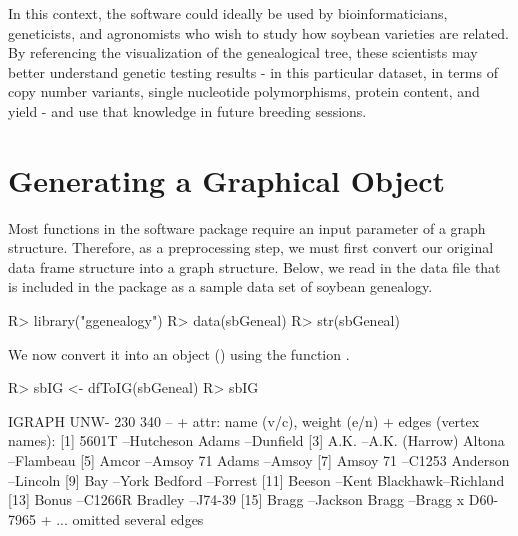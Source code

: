 \documentclass[article,shortnames]{jss}
\begin{document}
In this context, the software could ideally be used by bioinformaticians, geneticists, and agronomists who wish to study how soybean varieties are related. By referencing the visualization of the genealogical tree, these scientists may better understand genetic testing results - in this particular dataset, in terms of copy number variants, single nucleotide polymorphisms, protein content, and yield - and use that knowledge in future breeding sessions.

\section{Generating a Graphical Object}

Most functions in the software package require an input parameter of a graph structure. Therefore, as a preprocessing step, we must first convert our original data frame structure into a graph structure. Below, we read in the  data file  that is included in the package as a sample data set of soybean genealogy.

\begin{CodeChunk}
\begin{CodeInput}
R> library("ggenealogy")
R> data(sbGeneal)
R> str(sbGeneal)
\end{CodeInput}
\end{CodeChunk}

We now convert it into an  object (\citealt{igraph})  using the function .

\begin{CodeChunk}
\begin{CodeInput}
R> sbIG <- dfToIG(sbGeneal)
R> sbIG
\end{CodeInput}
\begin{CodeOutput}
IGRAPH UNW- 230 340 -- 
+ attr: name (v/c), weight (e/n)
+ edges (vertex names):
 [1] 5601T    --Hutcheson        Adams    --Dunfield        
 [3] A.K.     --A.K. (Harrow)    Altona   --Flambeau        
 [5] Amcor    --Amsoy 71         Adams    --Amsoy           
 [7] Amsoy 71 --C1253            Anderson --Lincoln         
 [9] Bay      --York             Bedford  --Forrest         
[11] Beeson   --Kent             Blackhawk--Richland        
[13] Bonus    --C1266R           Bradley  --J74-39          
[15] Bragg    --Jackson          Bragg    --Bragg x D60-7965
+ ... omitted several edges
\end{CodeOutput}
\end{CodeChunk}
\end{document}
